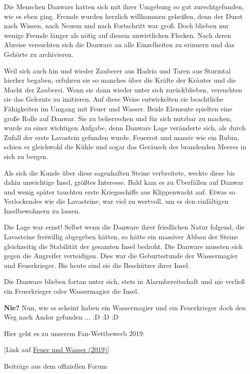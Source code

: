 \documentclass[10pt, a4paper, oneside]{book}
\newcommand{\refprodukt}[1]{\hyperref[Produkt: #1]{#1}}
\begin{document}
\begin{multicols}{2}
Die Menschen Danwars hatten sich mit ihrer Umgebung so gut zurechtgefunden, wie es eben ging. Fremde wurden herzlich willkommen geheißen, denn der Durst nach Wissen, nach Neuem und nach Fortschritt war groß. Doch blieben nur wenige Fremde länger als nötig auf diesem unwirtlichen Flecken. Nach deren Abreise versuchten sich die Danware an alle Einzelheiten zu erinnern und das Gehörte zu archivieren.\bigskip

Weil sich auch hin und wieder Zauberer aus Hadria und Taren aus Sturmtal hierher begaben, erfuhren sie so manches über die Kräfte der Kräuter und die Macht der Zauberei. Wenn sie dann wieder unter sich zurückblieben, versuchten sie das Gelernte zu imitieren. Auf diese Weise entwickelten sie beachtliche Fähigkeiten im Umgang mit Feuer und Wasser. Beide Elemente spielten eine große Rolle auf Danwar. Sie zu beherrschen und für sich nutzbar zu machen, wurde zu einer wichtigen Aufgabe, denn Danwars Lage veränderte sich, als durch Zufall der erste Lavastein gefunden wurde. Feuerrot und massiv wie ein Rubin, schien er gleichwohl die Kühle und sogar das Geräusch des brandenden Meeres in sich zu bergen.

Als sich die Kunde über diese sagenhaften Steine verbreitete, weckte diese bis dahin unwichtige Insel, größtes Interesse. Bald kam es zu Überfällen auf Danwar und wenig später tauchten erste Kriegsschiffe aus Klippenwacht auf. Etwas so Verlockendes wie die Lavasteine, war viel zu wertvoll, um es den einfältigen Inselbewohnern zu lassen.\bigskip

Die Lage war ernst! Selbst wenn die Danware ihrer friedlichen Natur folgend, die Lavasteine freiwillig abgegeben hätten, so hätte ein massiver Abbau der Steine gleichzeitig die Stabilität der gesamten Insel bedroht. Die Danware mussten sich gegen die Angreifer verteidigen. Dies war die Geburtsstunde der Wassermagier und Feuerkrieger. Bis heute sind sie die Beschützer ihrer Insel.\bigskip

Die Danware blieben fortan unter sich, stets in Alarmbereitschaft und nie verließ ein Feuerkrieger oder Wassermagier die Insel.\bigskip

\textbf{Nie?} Nun, wie es scheint haben ein Wassermagier und ein Feuerkrieger doch den Weg nach Andor gefunden ... :D :D :D\bigskip

Hier geht es zu unserem Fan-Wettbewerb 2019: 

[Link auf \refprodukt{Feuer und Wasser (2019)}]\bigskip

\begin{center}
    Beiträge aus dem offiziellen Forum
\end{center}


\end{multicols}
\end{document}
